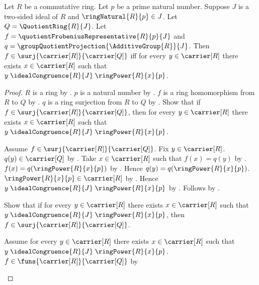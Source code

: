 \begin{theorem}\label{quotient_frobenius_representative_surjective_iff}
    Let $R$ be a commutative ring.
    Let $p$ be a prime natural number.
    Suppose $J$ is a two-sided ideal of $R$ and
        $\ringNatural{R}{p}\in J$.
    Let $Q=\QuotientRing{R}{J}$.
    Let $f=\quotientFrobeniusRepresentative{R}{p}{J}$ and
        $q=\groupQuotientProjection{\AdditiveGroup{R}}{J}$.
    Then $f\in\surj{\carrier[R]}{\carrier[Q]}$ iff
        for every $y\in\carrier[R]$ there exists $x\in\carrier[R]$
            such that
            $y\mathrel{\idealCongruence{R}{J}}
                \ringPower{R}{x}{p}$.
\end{theorem}
\begin{proof}
    $R$ is a ring by .
    $p$ is a natural number by .
    $f$ is a ring homomorphism from $R$ to $Q$ by
        .
    $q$ is a ring surjection from $R$ to $Q$ by
        .
    Show that if $f\in\surj{\carrier[R]}{\carrier[Q]}$, then
        for every $y\in\carrier[R]$ there exists $x\in\carrier[R]$
            such that
            $y\mathrel{\idealCongruence{R}{J}}
                \ringPower{R}{x}{p}$.
    \begin{subproof}
        Assume $f\in\surj{\carrier[R]}{\carrier[Q]}$.
        Fix $y\in\carrier[R]$.
        $q(y)\in\carrier[Q]$ by
            .
        Take $x\in\carrier[R]$ such that $f(x)=q(y)$ by
            .
        $f(x)=q(\ringPower{R}{x}{p})$ by
            .
        Hence $q(y)=q(\ringPower{R}{x}{p})$.
        $\ringPower{R}{x}{p}\in\carrier[R]$ by
            .
        Hence
            $y\mathrel{\idealCongruence{R}{J}}
                \ringPower{R}{x}{p}$ by
            .
        Follows by \auto.
    \end{subproof}
    Show that if for every $y\in\carrier[R]$ there exists
        $x\in\carrier[R]$ such that
            $y\mathrel{\idealCongruence{R}{J}}
                \ringPower{R}{x}{p}$,
        then $f\in\surj{\carrier[R]}{\carrier[Q]}$.
    \begin{subproof}
        Assume for every $y\in\carrier[R]$ there exists
            $x\in\carrier[R]$ such that
                $y\mathrel{\idealCongruence{R}{J}}
                    \ringPower{R}{x}{p}$.
        $f\in\funs{\carrier[R]}{\carrier[Q]}$ by

\end{subproof}
\end{proof}
